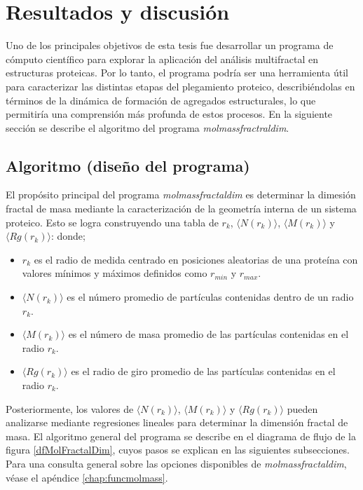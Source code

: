 \chapter{Resultados y discusi\'{o}n}
\label{chap:resulyd}

Uno de los principales objetivos de esta tesis fue desarrollar un programa de c\'{o}mputo cient\'{i}fico para explorar la aplicaci\'{o}n del an\'{a}lisis multifractal en estructuras proteicas. Por lo tanto, el programa podr\'{i}a ser una herramienta \'{u}til para caracterizar las distintas etapas del plegamiento proteico, describi\'{e}ndolas en t\'{e}rminos de la din\'{a}mica de formaci\'{o}n de agregados estructurales, lo que permitir\'{i}a una comprensi\'{o}n m\'{a}s profunda de estos procesos. En la siguiente secci\'{o}n se describe el algoritmo del programa \textit{molmassfractraldim}. 
 
 
\section{Algoritmo (diseño del programa)}
\label{sec:algoritmo}

El prop\'{o}sito principal del programa \textit{molmassfractaldim} es determinar la dimesi\'{o}n fractal de masa mediante la caracterizaci\'{o}n de la geometr\'{i}a interna de un sistema proteico. Esto se logra construyendo una tabla de $r_{k}$, $\langle N(r_k) \rangle$, $\langle M(r_k) \rangle$ y $\langle Rg(r_k) \rangle$: donde;

\begin{itemize}
	\item $r_{k}$ es el radio de medida centrado en posiciones aleatorias de una prote\'{i}na con valores m\'{i}nimos y m\'{a}ximos definidos como $r_{min}$ y $r_{max}$.
	\item $\langle N(r_k) \rangle$ es el n\'{u}mero promedio de part\'{i}culas contenidas dentro de un radio $r_{k}$. 
	\item  $\langle M(r_k) \rangle$ es el n\'{u}mero de masa promedio de las part\'{i}culas contenidas en el radio $r_{k}$.
	\item  $\langle Rg(r_k) \rangle$ es el radio de giro promedio de las part\'{i}culas contenidas en el radio $r_{k}$.
\end{itemize}

Posteriormente, los valores de $\langle N(r_k) \rangle$, $\langle M(r_k) \rangle$ y $\langle Rg(r_k) \rangle$ pueden analizarse mediante regresiones lineales para determinar la dimensi\'{o}n fractal de masa. El algoritmo general del programa se describe en el diagrama de flujo de la figura \ref{dfMolFractalDim}, cuyos pasos se explican en las siguientes subsecciones. Para una consulta general sobre las opciones disponibles de \textit{molmassfractaldim}, véase el apéndice \ref{chap:funcmolmass}.

